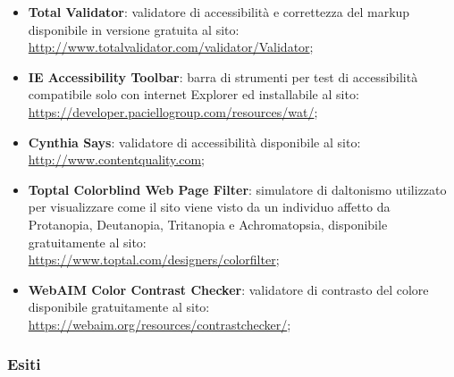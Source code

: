 \documentclass[12pt]{article}
\begin{document}
	\begin{itemize}
		\item \textbf{Total Validator}: validatore di accessibilità e correttezza del markup disponibile in versione gratuita al sito:
		\\ \url{http://www.totalvalidator.com/validator/Validator};
		
		\item \textbf{IE Accessibility Toolbar}: barra di strumenti per test di accessibilità compatibile solo con internet Explorer ed installabile al sito:
		\\ \url{https://developer.paciellogroup.com/resources/wat/};
		
		\item \textbf{Cynthia Says}: validatore di accessibilità disponibile al sito: 
		\\ \url{http://www.contentquality.com};
		
		\item \textbf{Toptal Colorblind Web Page Filter}: simulatore di daltonismo utilizzato per visualizzare come il sito viene visto da un individuo affetto da Protanopia, Deutanopia, Tritanopia e Achromatopsia, disponibile gratuitamente al sito: 
		\\ \url{https://www.toptal.com/designers/colorfilter};
		
		\item \textbf{WebAIM Color Contrast Checker}: validatore di contrasto del colore disponibile gratuitamente al sito: 
		\\ \url{https://webaim.org/resources/contrastchecker/};
	\end{itemize}
	
	\subsubsection{Esiti}
	
\end{document}
